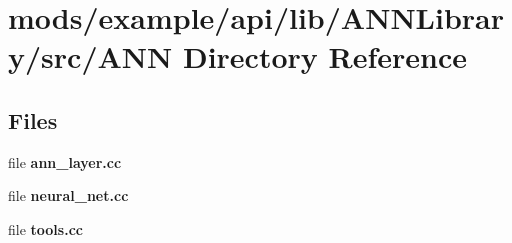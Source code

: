 \section{mods/example/api/lib/\+A\+N\+N\+Library/src/\+A\+N\+N Directory Reference}
\label{dir_87f24ed36f3bbefc8b97fc0739403f35}
\subsection*{Files}
\begin{DoxyCompactItemize}
\item 
file {\bfseries ann\+\_\+layer.\+cc}
\item 
file {\bfseries neural\+\_\+net.\+cc}
\item 
file {\bfseries tools.\+cc}
\end{DoxyCompactItemize}
